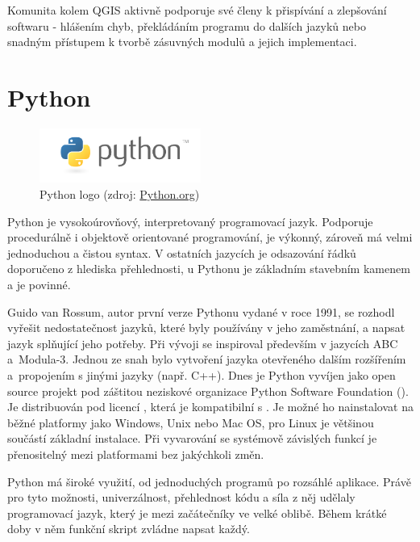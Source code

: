 Komunita kolem QGIS aktivně podporuje své členy k přispívání a
zlepšování softwaru - hlášením chyb, překládáním programu do dalších
jazyků nebo snadným přístupem k tvorbě zásuvných modulů a jejich
implementaci.


\section{Python}

\begin{figure}[H] \centering
      \includegraphics[width=150pt]{./pictures/python-logo-master-v3-TM.png}
      \caption[Python logo]{Python logo (zdroj:
\href{https://www.python.org/static/community_logos/python-logo-master-v3-TM.png}{Python.org})}
      \label{fig:python}
  \end{figure}
  
Python je vysokoúrovňový, interpretovaný programovací jazyk. Podporuje
procedurálně i objektově orientované programování, je výkonný, zároveň
má velmi jednoduchou a čistou syntax. V ostatních jazycích je
odsazování řádků doporučeno z hlediska přehlednosti, u Pythonu je
základním stavebním kamenem a je povinné.

Guido van Rossum, autor první verze Pythonu vydané v roce 1991, se
rozhodl vyřešit nedostatečnost jazyků, které byly používány v jeho
zaměstnání, a napsat jazyk splňující jeho potřeby. Při vývoji se
inspiroval především v jazycích ABC a~Modula-3. Jednou ze snah bylo
vytvoření jazyka otevřeného dalším rozšířením a~propojením s jinými
jazyky (např. C++). Dnes je Python vyvíjen jako open source projekt
pod záštitou neziskové organizace Python Software Foundation
(). Je distribuován pod licencí , která je
kompatibilní s . Je možné ho nainstalovat na běžné platformy
jako Windows, Unix nebo Mac OS, pro Linux je většinou součástí
základní instalace. Při vyvarování se systémově závislých funkcí je
přenositelný mezi platformami bez jakýchkoli změn.

Python má široké využití, od jednoduchých programů po rozsáhlé
aplikace. Právě pro tyto možnosti, univerzálnost, přehlednost kódu a
síla z něj udělaly programovací jazyk, který je mezi začátečníky ve
velké oblibě. Během krátké doby v něm funkční skript zvládne napsat
každý.
  
